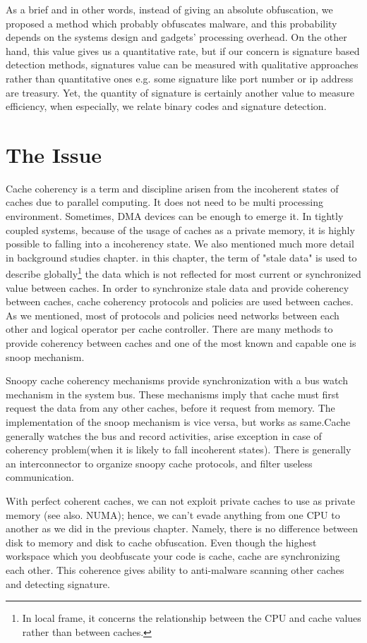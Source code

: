 As a brief and in other words, instead of giving an absolute obfuscation, we proposed a method which probably obfuscates malware, and this probability depends on the systems design and gadgets' processing overhead. On the other hand, this value gives us a quantitative rate, but if our concern is signature based detection methods, signatures value can be measured with qualitative approaches rather than quantitative ones e.g. some signature like port number or ip address are treasury.  Yet, the quantity of signature is certainly another value to measure efficiency, when especially, we relate binary codes and signature detection.

\section{The Issue}
Cache coherency is a term and discipline arisen from the incoherent states of caches due to parallel computing. It does not need to be multi processing environment. Sometimes, DMA devices can be enough to emerge it. In tightly coupled systems, because of the usage of caches as a private memory, it is highly possible to falling into a incoherency state. We also mentioned much more detail in background studies chapter. in this chapter, the term of "stale data" is used to describe globally\footnote{In local frame, it concerns the relationship between the CPU and cache values rather than between caches. } the data which is not reflected for most current or synchronized value between caches. In order to synchronize stale data and provide coherency between caches, cache coherency protocols and policies are used between caches. As we mentioned, most of  protocols and policies need networks between each other and logical operator per cache controller. There are many methods to provide coherency between caches and one of the most known and capable one is snoop mechanism. 

Snoopy cache coherency mechanisms provide synchronization with a bus watch mechanism in the system bus. These mechanisms imply that cache must first request the data from any other caches, before it request from memory. The implementation of the snoop mechanism is vice versa, but works as same.Cache generally watches the bus and record activities, arise exception in case of coherency problem(when it is likely to fall incoherent states). There is generally an interconnector to organize snoopy cache protocols, and filter useless communication. 

With perfect coherent caches, we can not exploit private caches to use as private memory (see also. NUMA); hence, we can't evade anything from one CPU to another as we did in the previous chapter. Namely, there is no difference between disk to memory and disk to cache obfuscation. Even though the highest workspace which you deobfuscate your code is cache, cache are synchronizing each other. This coherence gives ability to anti-malware scanning other caches and detecting signature.
